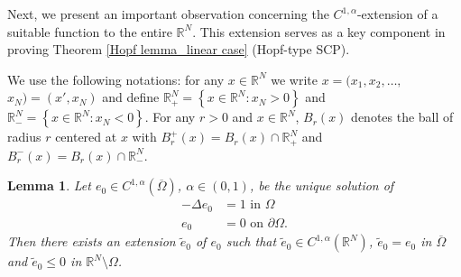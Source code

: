 \documentclass[reqno,oneside]{amsart}
\newtheorem{lemma}[theorem]{Lemma}
\theoremstyle{definition}
\theoremstyle{remark}
\numberwithin{equation}{section}
\newcommand{\Om} {\Omega}
\newcommand{\pa}{\partial}
\newcommand{\sr}{\mathbb{R}}
\newcommand{\omc}{(\overline{\Om})}
\begin{document}
Next, we present an important observation concerning the $C^{1,\alpha}$-extension of a suitable function to the entire $\sr^N$. This extension serves as a key component in proving Theorem \ref{Hopf lemma_linear case} (Hopf-type SCP).

We use the following notations: for any $x\in \sr^N$ we write $x= (x_1, x_2, \dots,$ $ x_N) = (x', x_N)$ and define $\sr^N_+ = \left\{x\in \sr^N : x_N >0\right\}$ and $\sr^N_- = \left\{ x\in \sr^N : x_N <0\right\}$. For any $r>0$ and $x\in \sr^N$, $B_r (x)$ denotes the ball of radius $r$ centered at $x$ with $B_r^+ (x) = B_r (x) \cap \sr^N_+ $ and $B_r^- (x) = B_r (x) \cap \sr^N_-$.

\begin{lemma}\label{extension of e}
    Let $e_0 \in C^{1,\alpha} \omc$, $\alpha \in (0,1)$, be the unique solution of
    \begin{equation}\label{e_0 equation}
        \begin{aligned}
            -\Delta e_0 &=1 \text{ in } \Om\\
            e_0 &= 0 \text{ on } \pa\Om.
        \end{aligned}
    \end{equation}
    Then there exists an extension $\tilde{e}_0$ of $e_0$ such that $\tilde{e}_0 \in C^{1,\alpha} (\sr^N)$, $\tilde{e}_0 = e_0$ in $\overline{\Om}$ and $\tilde{e}_0 \leq 0$ in $\sr^N \setminus \Om$.
\end{lemma}
\end{document}
